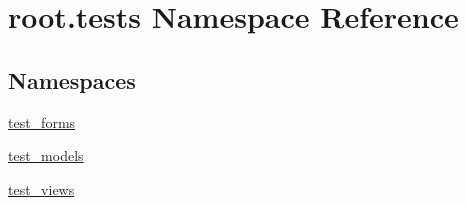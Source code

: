 \hypertarget{namespaceroot_1_1tests}{\section{root.\-tests Namespace Reference}
\label{namespaceroot_1_1tests}
}
\subsection*{Namespaces}
\begin{DoxyCompactItemize}
\item 
\hyperlink{namespaceroot_1_1tests_1_1test__forms}{test\-\_\-forms}
\item 
\hyperlink{namespaceroot_1_1tests_1_1test__models}{test\-\_\-models}
\item 
\hyperlink{namespaceroot_1_1tests_1_1test__views}{test\-\_\-views}
\end{DoxyCompactItemize}
